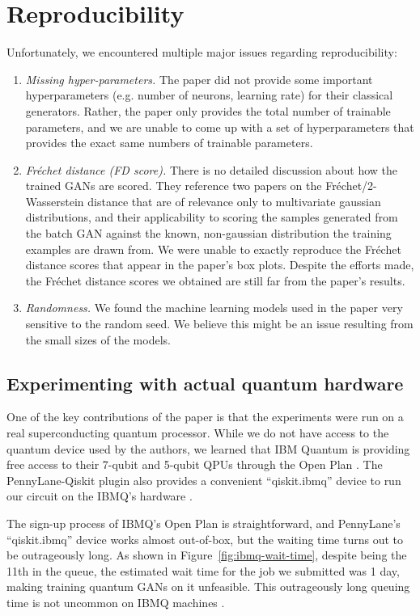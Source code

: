 \section{Reproducibility}

Unfortunately, we encountered multiple major issues regarding reproducibility:
\begin{enumerate}
    \item \textit{Missing hyper-parameters.} The paper did not provide some important hyperparameters (e.g. number of neurons, learning rate) for their classical generators. Rather, the paper only provides the total number of trainable parameters, and we are unable to come up with a set of hyperparameters that provides the exact same numbers of trainable parameters.
    \item \textit{Fr\'echet distance (FD score).} There is no detailed discussion about how the trained GANs are scored.  They reference two papers
    on the Fr\'echet/2-Wasserstein distance that are of relevance only to multivariate gaussian distributions, and their applicability to scoring
    the samples generated from the batch GAN against the known, non-gaussian distribution the training examples are drawn from.  We were unable to exactly
    reproduce the Fr\'echet distance scores that appear in the paper's box plots. Despite the efforts made, the Fr\'echet distance scores we obtained are still far from the paper's results.
    \item \textit{Randomness.} We found the machine learning models used in the paper very sensitive to the random seed. We believe this might be an issue resulting from the small sizes of the models. 
\end{enumerate}


\subsection{Experimenting with actual quantum hardware}
One of the key contributions of the paper is that the experiments were run on a real superconducting quantum processor. While we do not have access to the quantum device used by the authors, we learned that IBM Quantum is providing free access to their 7-qubit and 5-qubit QPUs through the Open Plan \cite{ibmq_plans}. The PennyLane-Qiskit plugin also provides a convenient ``qiskit.ibmq'' device to run our circuit on the IBMQ's hardware \cite{pennylane-qiskit}. 

The sign-up process of IBMQ's Open Plan is straightforward, and PennyLane's ``qiskit.ibmq'' device works almost out-of-box, but the waiting time turns out to be outrageously long. As shown in Figure~\ref{fig:ibmq-wait-time}, despite being the 11th in the queue, the estimated wait time for the job we submitted was 1 day, making training quantum GANs on it unfeasible. This outrageously long queuing time is not uncommon on IBMQ machines \cite{ravi2021quantum}.

